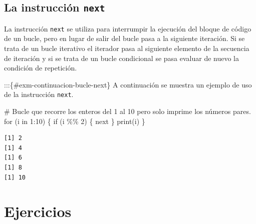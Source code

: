 \documentclass[
  a4paper,
]{scrreport}
\newenvironment{Shaded}{\begin{snugshade}}{\end{snugshade}}
\newcommand{\CommentTok}[1]{\textcolor[rgb]{0.37,0.37,0.37}{#1}}
\newcommand{\ControlFlowTok}[1]{\textcolor[rgb]{0.00,0.23,0.31}{#1}}
\newcommand{\DecValTok}[1]{\textcolor[rgb]{0.68,0.00,0.00}{#1}}
\newcommand{\FunctionTok}[1]{\textcolor[rgb]{0.28,0.35,0.67}{#1}}
\newcommand{\NormalTok}[1]{\textcolor[rgb]{0.00,0.23,0.31}{#1}}
\newcommand{\SpecialCharTok}[1]{\textcolor[rgb]{0.37,0.37,0.37}{#1}}
\theoremstyle{definition}
\theoremstyle{definition}
\theoremstyle{remark}
\begin{document}
\hypertarget{la-instrucciuxf3n-next}{%
\subsection{\texorpdfstring{La instrucción
\texttt{next}}{La instrucción next}}\label{la-instrucciuxf3n-next}}

La instrucción \texttt{next} se utiliza para interrumpir la ejecución
del bloque de código de un bucle, pero en lugar de salir del bucle pasa
a la siguiente iteración. Si se trata de un bucle iterativo el iterador
pasa al siguiente elemento de la secuencia de iteración y si se trata de
un bucle condicional se pasa evaluar de nuevo la condición de
repetición.

:::\{\#exm-continuacion-bucle-next\} A continuación se muestra un
ejemplo de uso de la instrucción \texttt{next}.

\begin{Shaded}
\begin{Highlighting}[]
\CommentTok{\# Bucle que recorre los enteros del 1 al 10 pero solo imprime los números pares.}
\ControlFlowTok{for}\NormalTok{ (i }\ControlFlowTok{in} \DecValTok{1}\SpecialCharTok{:}\DecValTok{10}\NormalTok{) \{}
  \ControlFlowTok{if}\NormalTok{ (i }\SpecialCharTok{\%\%} \DecValTok{2}\NormalTok{) \{}
    \ControlFlowTok{next}
\NormalTok{  \}}
  \FunctionTok{print}\NormalTok{(i)}
\NormalTok{\}}
\end{Highlighting}
\end{Shaded}

\begin{verbatim}
[1] 2
[1] 4
[1] 6
[1] 8
[1] 10
\end{verbatim}

\hypertarget{ejercicios-2}{%
\section{Ejercicios}\label{ejercicios-2}}
\end{document}
